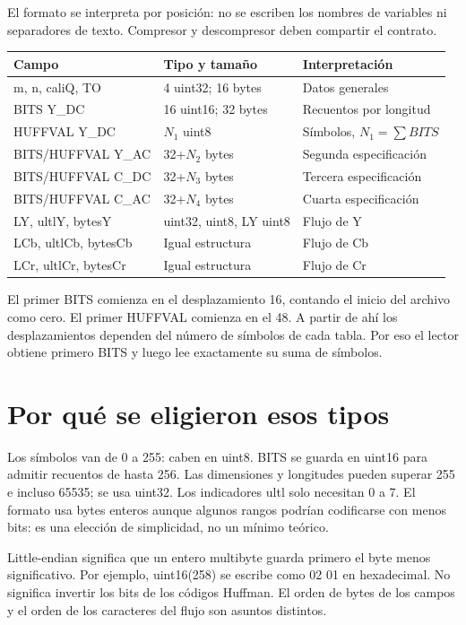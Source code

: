 \documentclass[11pt,a4paper,oneside]{report}
\begin{document}
El formato se interpreta por posición: no se escriben los nombres de variables
ni separadores de texto. Compresor y descompresor deben compartir el contrato.
\begin{center}\begin{tabular}{p{}p{}p{}}
\toprule Campo & Tipo y tamaño & Interpretación\\\midrule
m, n, caliQ, TO & 4 uint32; 16 bytes & Datos generales\\
BITS Y\_DC & 16 uint16; 32 bytes & Recuentos por longitud\\
HUFFVAL Y\_DC & $N_1$ uint8 & Símbolos, $N_1=\sum BITS$\\
BITS/HUFFVAL Y\_AC & 32+$N_2$ bytes & Segunda especificación\\
BITS/HUFFVAL C\_DC & 32+$N_3$ bytes & Tercera especificación\\
BITS/HUFFVAL C\_AC & 32+$N_4$ bytes & Cuarta especificación\\
LY, ultlY, bytesY & uint32, uint8, LY uint8 & Flujo de Y\\
LCb, ultlCb, bytesCb & Igual estructura & Flujo de Cb\\
LCr, ultlCr, bytesCr & Igual estructura & Flujo de Cr\\\bottomrule
\end{tabular}\end{center}
El primer BITS comienza en el desplazamiento 16, contando el inicio del archivo
como cero. El primer HUFFVAL comienza en el 48. A partir de ahí los desplazamientos
dependen del número de símbolos de cada tabla. Por eso el lector obtiene primero
BITS y luego lee exactamente su suma de símbolos.


\section{Por qué se eligieron esos tipos}

Los símbolos van de 0 a 255: caben en uint8. BITS se guarda en uint16 para
admitir recuentos de hasta 256. Las dimensiones y longitudes pueden superar
255 e incluso 65535; se usa uint32. Los indicadores ultl solo necesitan 0 a 7.
El formato usa bytes enteros aunque algunos rangos podrían codificarse con menos bits:
es una elección de simplicidad, no un mínimo teórico.

Little-endian significa que un entero multibyte guarda primero el byte menos
significativo. Por ejemplo, uint16(258) se escribe como 02 01 en hexadecimal.
No significa invertir los bits de los códigos Huffman. El orden de bytes de
los campos y el orden de los caracteres del flujo son asuntos distintos.
\end{document}
